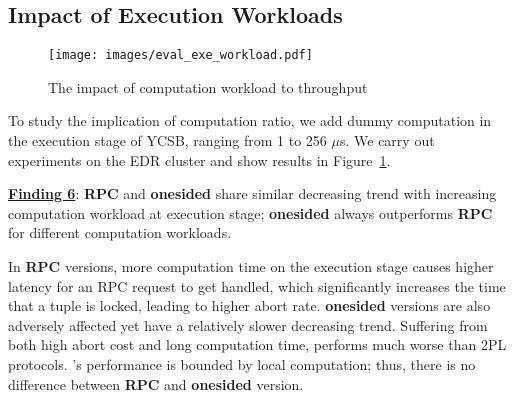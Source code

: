 \vspace{-2mm}
\subsection{Impact of Execution Workloads}

\begin{figure}[htp]
    \centering
    \vspace{-0.2cm}
    \texttt{[image: images/eval\_exe\_workload.pdf]}
    \vspace{-0.4cm}
    \caption{The impact of computation workload to throughput}
    \vspace{-0.2cm}
    \label{fig:eval_sleep_curve}
\end{figure}

To study the implication of computation ratio, we add dummy computation in the execution stage of YCSB, ranging from 1 to 256 $\mu$s. We carry out experiments on the EDR cluster and show results in Figure~\ref{fig:eval_sleep_curve}.

\underline{\bf Finding 6}: \textbf{RPC} and \textbf{onesided} share similar decreasing trend with increasing computation workload at execution stage; \textbf{onesided} always outperforms \textbf{RPC} for different computation workloads.



In \textbf{RPC} versions, more computation time on the execution stage causes higher latency for an RPC request to get handled, which significantly increases the time that a tuple is locked, leading to higher abort rate. \textbf{onesided} versions are also adversely affected yet have a relatively slower decreasing trend. 
Suffering from both high abort cost and long computation time, \occ performs much worse than 2PL protocols. \calvin's performance is bounded by local computation; thus, there is no difference between {\bf RPC} and \textbf{onesided} version.






